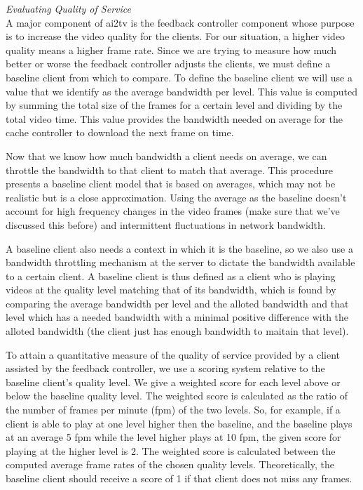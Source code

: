 \documentclass{sig-alternate}
\begin{document}
\textit{Evaluating Quality of Service} \\
A major component of ai2tv is the feedback controller component whose
purpose is to increase the video quality for the clients.  For our
situation, a higher video quality means a higher frame rate.  Since we
are trying to measure how much better or worse the feedback controller
adjusts the clients, we must define a baseline client from which to
compare.  To define the baseline client we will use a value that we
identify as the average bandwidth per level.  This value is computed
by summing the total size of the frames for a certain level and
dividing by the total video time.  This value provides the bandwidth
needed on average for the cache controller to download the next frame
on time.

Now that we know how much bandwidth a client needs on average, we can
throttle the bandwidth to that client to match that average.  This
procedure presents a baseline client model that is based on averages,
which may not be realistic but is a close approximation.  Using the
average as the baseline doesn't account for high frequency changes in
the video frames (make sure that we've discussed this before) and
intermittent fluctuations in network bandwidth.

A baseline client also needs a context in which it is the baseline, so
we also use a bandwidth throttling mechanism \cite{SHAPERD} at the
server to dictate the bandwidth available to a certain client.  A
baseline client is thus defined as a client who is playing videos at
the quality level matching that of its bandwidth, which is found by
comparing the average bandwidth per level and the alloted bandwidth
and that level which has a needed bandwidth with a minimal positive
difference with the alloted bandwidth (the client just has enough
bandwidth to maitain that level).

To attain a quantitative measure of the quality of service provided by
a client assisted by the feedback controller, we use a scoring system
relative to the baseline client's quality level.  We give a weighted
score for each level above or below the baseline quality level.  The
weighted score is calculated as the ratio of the number of frames per
minute (fpm) of the two levels.  So, for example, if a client is able
to play at one level higher then the baseline, and the baseline plays
at an average 5 fpm while the level higher plays at 10 fpm, the given
score for playing at the higher level is 2.  The weighted score is
calculated between the computed average frame rates of the chosen
quality levels.  Theoretically, the baseline client should receive a
score of 1 if that client does not miss any frames.
\end{document}

